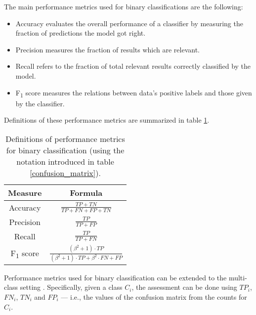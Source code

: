                 The main performance metrics used for binary classifications are the following:
                \begin{itemize}
                    \item Accuracy evaluates the overall performance of a classifier by measuring the fraction of predictions the model got right.
                    \item Precision measures the fraction of results which are relevant.
                    \item Recall refers to the fraction of total relevant results correctly classified by the model.
                    \item F\textsubscript{1} score measures the relations between data’s positive labels and those given by the classifier.
                \end{itemize}
                Definitions of these performance metrics are summarized in table \ref{binary_metrics}.
                
                \begin{table}
                    \centering
                    \renewcommand{\arraystretch}{2}
                    \begin{tabulary}{\textwidth}{|C|C|}
                        \hline
                        Measure & Formula \\ \hline \hline
                        Accuracy & \(\frac{TP+TN}{TP+FN+FP+TN}\) \\ \hline
                        Precision & \(\frac{TP}{TP+FP}\) \\ \hline
                        Recall & \(\frac{TP}{TP+FN}\) \\ \hline
                        F\textsubscript{1} score & \(\frac{\left(\beta^{2}+1\right) \cdot TP}{\left(\beta^{2}+1\right)\cdot TP+\beta^{2}\cdot FN+FP}\) \\ \hline
                    \end{tabulary}
                    \caption{Definitions of performance metrics for binary classification (using the notation introduced in table \ref{confusion_matrix}).}
                    \label{binary_metrics}
                \end{table}
                
                Performance metrics used for binary classification can be extended to the multi-class setting \cite{Sokolova}. Specifically, given a class \(C_{i}\), the assessment can be done using \(TP_i\), \(FN_i\), \(TN_i\) and \(FP_i\) --- i.e., the values of the confusion matrix from the counts for \(C_i\).
                
